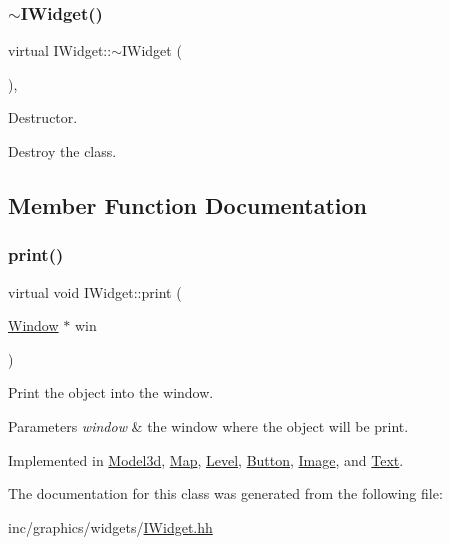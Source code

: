 \subsubsection{\texorpdfstring{$\sim$\+I\+Widget()}{~IWidget()}}
{\footnotesize\ttfamily virtual I\+Widget\+::$\sim$\+I\+Widget (\begin{DoxyParamCaption}{ }\end{DoxyParamCaption})\hspace{0.3cm}{\ttfamily [inline]}, {\ttfamily [virtual]}}



Destructor. 

Destroy the class. 

\subsection{Member Function Documentation}
\mbox{\label{classIWidget_a0cfa49a402e9bb31808a715e048ab2f4}} 
\subsubsection{\texorpdfstring{print()}{print()}}
{\footnotesize\ttfamily virtual void I\+Widget\+::print (\begin{DoxyParamCaption}\item[{\hyperlink{classWindow}{Window} $\ast$}]{win }\end{DoxyParamCaption})\hspace{0.3cm}{\ttfamily [pure virtual]}}



Print the object into the window. 


\begin{DoxyParams}{Parameters}
{\em \textquotesingle{}window\textquotesingle{}} & the window where the object will be print. \\
\hline
\end{DoxyParams}


Implemented in \hyperlink{classModel3d_ae02d86ac82ec9f435cf1ebe668f3a6dd}{Model3d}, \hyperlink{classMap_a031a9bf528b1d14c60931d37d68bb4e3}{Map}, \hyperlink{classLevel_ab8311fe64b7957d627053359331b0b6b}{Level}, \hyperlink{classButton_aaee0c62414711ae91084b05b38d0c8c5}{Button}, \hyperlink{classImage_aca043fb78326d6ce135498419e2d1833}{Image}, and \hyperlink{classText_ab2be08831f604b8a957d540087ba4741}{Text}.



The documentation for this class was generated from the following file\+:\begin{DoxyCompactItemize}
\item 
inc/graphics/widgets/\hyperlink{IWidget_8hh}{I\+Widget.\+hh}\end{DoxyCompactItemize}
